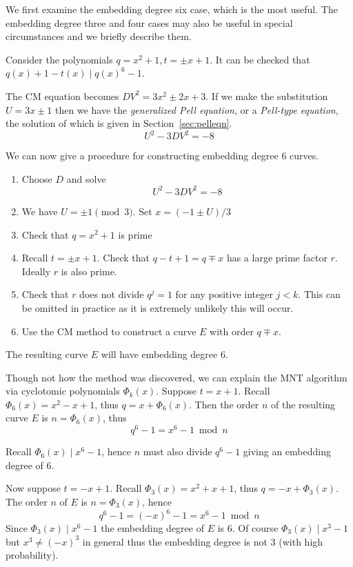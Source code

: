 We first examine the embedding degree six case, which is the most useful.
The embedding degree three and four cases may also be useful in special
circumstances and we briefly describe them.

Consider the polynomials $q = x^2 + 1, t = \pm x + 1$.
It can be checked that $q(x) + 1 - t(x) \mid q(x)^6 - 1$.

The CM equation becomes $D V^2 = 3 x^2 \pm 2 x + 3$. If we make
the substitution $U = 3x \pm 1$ then we have
the \emph{generalized Pell equation}, or a \emph{Pell-type
equation}, the solution of which is given in Section~\ref{sec:pelleqn}.
\[
U^2 - 3DV^2 = -8
\]

We can now give a procedure for constructing embedding degree 6 curves.

\begin{enumerate}
\item
Choose $D$ and solve
\[ U^2 - 3DV^2 = -8 \]
\item
We have $U = \pm 1 \pmod 3$. Set $x = (-1 \pm U) / 3$
\item
Check that $q = x^2 + 1$ is prime
\item
Recall $t = \pm x + 1$.
Check that $q - t + 1 = q \mp x$ has a large prime factor $r$.
Ideally $r$ is also prime.
\item
Check that $r$ does not divide $q^j = 1$ for any positive integer $j < k$.
This can be omitted in practice as it is extremely unlikely this will
occur.
\item
Use the CM method to construct a curve $E$ with order $q \mp x$.
\end{enumerate}

The resulting curve $E$ will have embedding degree 6.

Though not how the method was discovered,
we can explain the MNT algorithm via cyclotomic polynomials $\Phi_k(x)$.
Suppose $t = x + 1$.
Recall $\Phi_6(x) = x^2 - x + 1$, thus
$q = x + \Phi_6(x)$.
Then the order $n$ of the resulting
curve $E$ is $n = \Phi_6(x)$, thus
\[ q^6 - 1 = x^6 - 1 \bmod n \]

Recall $\Phi_6(x) \mid x^6 - 1$, hence $n$ must also divide $q^6 - 1$
giving an embedding degree of 6.

Now suppose $t = -x + 1$.
Recall $\Phi_3(x) = x^2 + x + 1$, thus
$q = -x + \Phi_3(x)$.
The order $n$ of $E$ is $n = \Phi_3(x)$, hence
\[ q^6 - 1 = (-x)^6 - 1 = x^6 - 1 \bmod n \]
Since $\Phi_3(x) \mid x^6 - 1$ the embedding degree of $E$ is 6.
Of course $\Phi_3(x) \mid x^3 - 1$ but $x^3 \ne (-x)^3$ in general
thus the embedding degree is not 3 (with high probability).

